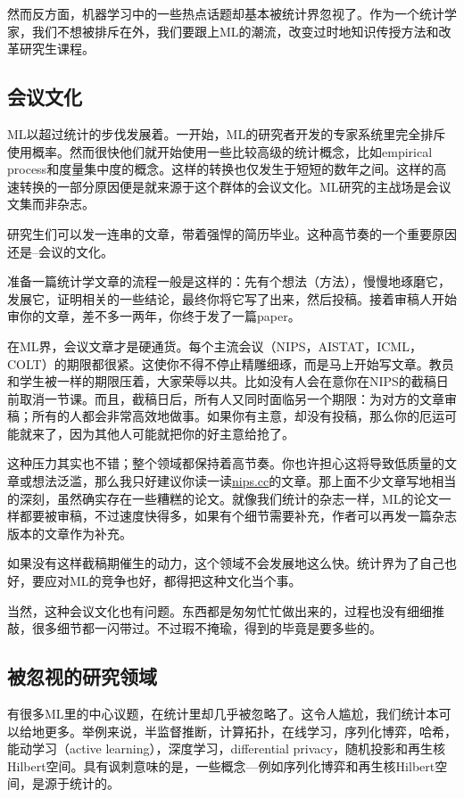 \documentclass[]{article}
\begin{document}
\indent 然而反方面，机器学习中的一些热点话题却基本被统计界忽视了。作为一个统计学家，我们不想被排斥在外，我们要跟上ML的潮流，改变过时地知识传授方法和改革研究生课程。

\subsection{会议文化}

ML以超过统计的步伐发展着。一开始，ML的研究者开发的专家系统里完全排斥使用概率。然而很快他们就开始使用一些比较高级的统计概念，比如empirical process和度量集中度的概念。这样的转换也仅发生于短短的数年之间。这样的高速转换的一部分原因便是就来源于这个群体的会议文化。ML研究的主战场是会议文集而非杂志。

\indent 研究生们可以发一连串的文章，带着强悍的简历毕业。这种高节奏的一个重要原因还是--会议的文化。 

\indent 准备一篇统计学文章的流程一般是这样的：先有个想法（方法），慢慢地琢磨它，发展它，证明相关的一些结论，最终你将它写了出来，然后投稿。接着审稿人开始审你的文章，差不多一两年，你终于发了一篇paper。

\indent 在ML界，会议文章才是硬通货。每个主流会议（NIPS，AISTAT，ICML，COLT）的期限都很紧。这使你不得不停止精雕细琢，而是马上开始写文章。教员和学生被一样的期限压着，大家荣辱以共。比如没有人会在意你在NIPS的截稿日前取消一节课。而且，截稿日后，所有人又同时面临另一个期限：为对方的文章审稿；所有的人都会非常高效地做事。如果你有主意，却没有投稿，那么你的厄运可能就来了，因为其他人可能就把你的好主意给抢了。

\indent 这种压力其实也不错；整个领域都保持着高节奏。你也许担心这将导致低质量的文章或想法泛滥，那么我只好建议你读一读\url{nips.cc}的文章。那上面不少文章写地相当的深刻，虽然确实存在一些糟糕的论文。就像我们统计的杂志一样，ML的论文一样都要被审稿，不过速度快得多，如果有个细节需要补充，作者可以再发一篇杂志版本的文章作为补充。

\indent 如果没有这样截稿期催生的动力，这个领域不会发展地这么快。统计界为了自己也好，要应对ML的竞争也好，都得把这种文化当个事。

\indent 当然，这种会议文化也有问题。东西都是匆匆忙忙做出来的，过程也没有细细推敲，很多细节都一闪带过。不过瑕不掩瑜，得到的毕竟是要多些的。

\subsection{被忽视的研究领域}

有很多ML里的中心议题，在统计里却几乎被忽略了。这令人尴尬，我们统计本可以给地更多。举例来说，半监督推断，计算拓扑，在线学习，序列化博弈，哈希，能动学习（active learning），深度学习，differential privacy，随机投影和再生核Hilbert空间。具有讽刺意味的是，一些概念---例如序列化博弈和再生核Hilbert空间，是源于统计的。
\end{document}
